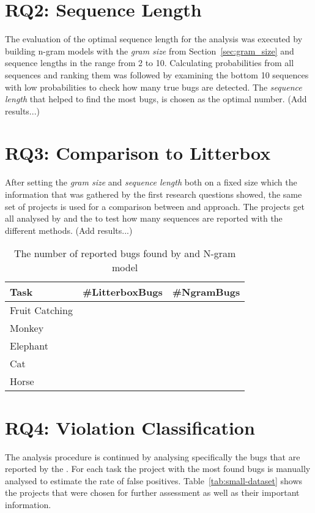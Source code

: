 \section{RQ2: Sequence Length}\label{sec:sequence_length}
The evaluation of the optimal sequence length for the analysis was executed by building n-gram models with the \textit{gram size} from Section~\ref{sec:gram_size} and {sequence lengths} in the range from 2 to 10. Calculating probabilities from all sequences and ranking them was followed by examining the bottom 10 sequences with low probabilities to check how many true bugs are detected. The \textit{sequence length} that helped to find the most bugs, is chosen as the optimal number. (Add results...)



\section{RQ3: Comparison to Litterbox}\label{sec:litterbox}
After setting the \textit{gram size} and \textit{sequence length} both on a fixed size which the information that was gathered by the first research questions showed, the same set of projects is used for a comparison between \litterbox{} and \ngram{} approach. The projects get all analysed by \litterbox{} and the \ngram{} to test how many sequences are reported with the different methods. (Add results...)

\begin{table}[H]
    \centering
    \caption[The number of reported bugs found by \litterbox{} and N-gram model]{\label{tab:litterbox}The number of reported bugs found by \litterbox{} and N-gram model}
    \begin{tabular}{lrr}
        \toprule
        Task & \#LitterboxBugs & \#NgramBugs \\
        \midrule
        Fruit Catching &  &\\
        Monkey &  &  \\
        Elephant &  & \\
        Cat &  &  \\
        Horse & &  \\
        \bottomrule
    \end{tabular}
\end{table}
 
 
\section{RQ4: Violation Classification}\label{sec:violations}
The analysis procedure is continued by analysing specifically the bugs that are reported by the \ngram{}. For each task the project with the most found bugs is manually analysed to estimate the rate of false positives. Table~\ref{tab:small-dataset} shows the projects that were chosen for further assessment as well as their important information.


